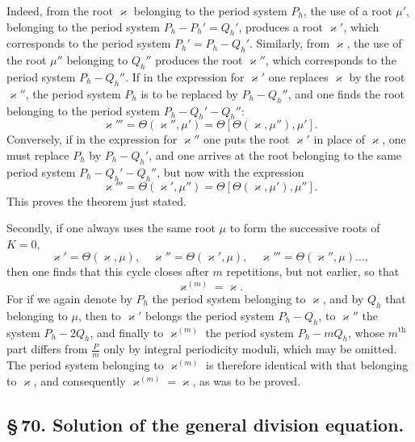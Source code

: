 \documentclass[10pt]{article}
\begin{document}
Indeed, from the root \(\varkappa\) belonging to the period system \(P_h\), the use of a root \(\mu'\), belonging to the period system \(P_h-P_h'=Q_h'\), produces a root \(\varkappa'\), which corresponds to the period system \(P_h'=P_h-Q_h'\). Similarly, from \(\varkappa\), the use of the root \(\mu''\) belonging to \(Q_h''\) produces the root \(\varkappa''\), which corresponds to the period system \(P_h-Q_h''\). If in the expression for \(\varkappa'\) one replaces \(\varkappa\) by the root \(\varkappa''\), the period system \(P_h\) is to be replaced by \(P_h-Q_h''\), and one finds the root belonging to the period system \(P_h-Q_h'-Q_h''\):
\[
\varkappa'''=\Theta(\varkappa'',\mu')=\Theta[\Theta(\varkappa,\mu''),\mu'].
\]
Conversely, if in the expression for \(\varkappa''\) one puts the root \(\varkappa'\) in place of \(\varkappa\), one must replace \(P_h\) by \(P_h-Q_h'\), and one arrives at the root belonging to the same period system \(P_h-Q_h'-Q_h''\), but now with the expression
\[
\varkappa'''=\Theta(\varkappa',\mu'')=\Theta[\Theta(\varkappa,\mu'),\mu''].
\]
This proves the theorem just stated.

Secondly, if one always uses the same root \(\mu\) to form the successive roots of \(K=0\),
\[
\varkappa'=\Theta(\varkappa,\mu),\quad
\varkappa''=\Theta(\varkappa',\mu),\quad
\varkappa'''=\Theta(\varkappa'',\mu)\ldots,
\]
then one finds that this cycle closes after \(m\) repetitions, but not earlier, so that
\[
\varkappa^{(m)}=\varkappa.
\]
For if we again denote by \(P_h\) the period system belonging to \(\varkappa\), and by \(Q_h\) that belonging to \(\mu\), then to \(\varkappa'\) belongs the period system \(P_h-Q_h\), to \(\varkappa''\) the system \(P_h-2Q_h\), and finally to \(\varkappa^{(m)}\) the period system \(P_h-mQ_h\), whose \(m^{\text{th}}\) part differs from \(\frac{P}{m}\) only by integral periodicity moduli, which may be omitted. The period system belonging to \(\varkappa^{(m)}\) is therefore identical with that belonging to \(\varkappa\), and consequently \(\varkappa^{(m)}=\varkappa\), as was to be proved.

\subsection*{\S\,70. Solution of the general division equation.}
\end{document}
